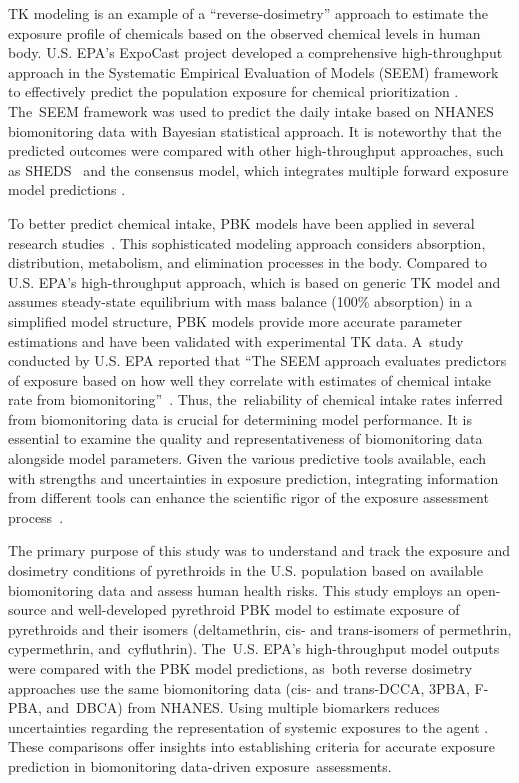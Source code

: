 \documentclass[toxics,article,accept,pdftex,moreauthors]{Definitions/mdpi}
\begin{document}
TK modeling is an example of a ``reverse-dosimetry'' approach to
estimate the exposure profile of chemicals
\citep{egeghy2011assessment, lin2023reconstructing} based on the
observed chemical levels in human body. U.S. EPA's ExpoCast
project developed a comprehensive high-throughput approach in the
Systematic Empirical Evaluation of Models (SEEM) framework to
effectively predict the population exposure for chemical prioritization
\citep{wambaugh2013high, stanfield2022bayesian}. The~SEEM framework was
used to predict the daily intake based on NHANES biomonitoring data with
Bayesian statistical approach. 
It is noteworthy that the predicted outcomes were compared with other high-throughput
approaches, such as SHEDS~\citep{isaacs2014sheds} and the consensus
model, which integrates multiple forward exposure model predictions
\citep{ring2018consensus}.

To better predict chemical intake, PBK models
have been applied in several research studies~\citep{tan2006use, allen2007use,
lyons2008computational, tornero2012pharmacokinetic, moreau2017using}. This
sophisticated modeling approach considers absorption, distribution, metabolism,
and elimination processes in the body. Compared to U.S. EPA's
high-throughput approach, which is based on generic TK model and assumes
steady-state equilibrium with mass balance (100\% absorption) in a simplified
model structure, PBK models provide more accurate parameter estimations and
have been validated with experimental TK data. A~study conducted by U.S.
EPA reported that ``The SEEM approach evaluates predictors of exposure based on
how well they correlate with estimates of chemical intake rate from
biomonitoring''~\citep{ring2018consensus}. Thus, the~reliability of chemical
intake rates inferred from biomonitoring data is crucial for determining model
performance. It is essential to examine the quality and
representativeness of biomonitoring data alongside model parameters. Given the various predictive
tools available, each with strengths and uncertainties in exposure prediction,
integrating information from different tools can enhance the scientific
rigor of the exposure assessment process~\citep{moreau2017using}.

The primary purpose of this study was to understand and track the
exposure and dosimetry conditions of pyrethroids in the U.S. population
based on available biomonitoring data and assess human health risks.
This study employs an open-source and well-developed pyrethroid PBK
model to estimate exposure of pyrethroids and their isomers
(deltamethrin, cis- and trans-isomers of permethrin, cypermethrin, and~cyfluthrin). The~U.S. EPA's high-throughput model outputs were compared
with the PBK model predictions, as~both reverse dosimetry approaches use
the same biomonitoring data (cis- and trans-DCCA, 3PBA, F-PBA, and~DBCA)
from NHANES. Using multiple biomarkers reduces uncertainties regarding
the representation of systemic exposures to the agent
\citep{lin2023reconstructing}. These comparisons offer insights into
establishing criteria for accurate exposure prediction in biomonitoring
data-driven exposure~assessments.
\end{document}
